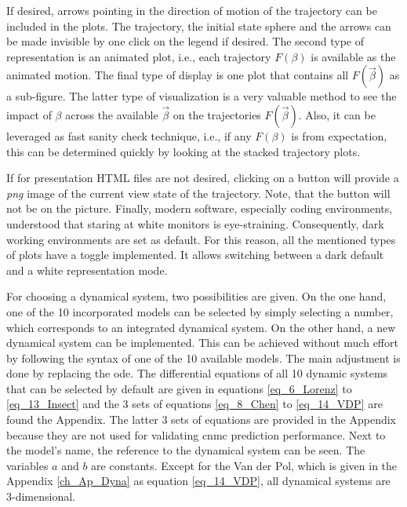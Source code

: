 If desired, arrows pointing in the direction of motion of the trajectory can be included in the plots.
The trajectory, the initial state sphere and the arrows can be made invisible by one click on the legend if desired. The second type of representation is an animated plot, i.e., each trajectory $ F(\beta)$ is available as the animated motion. The final type of display is one plot that contains all $F(\vec{\beta})$ as a sub-figure. 
The latter type of visualization is a very valuable method to see the impact of $\beta$ across the available $\vec{\beta }$ on the trajectories $ F(\vec{\beta})$.
Also, it can be leveraged as fast sanity check technique, i.e., if any $F(\beta )$ is from expectation, this can be determined quickly by looking at the stacked trajectory plots.
\newline

If for presentation HTML files are not desired, clicking on a button will provide a \emph{png} image of the current view state of the trajectory. Note, that the button will not be on the picture. 
Finally, modern software, especially coding environments, understood that staring at white monitors is eye-straining. Consequently, dark working environments are set as default. For this reason, all the mentioned types of plots have a toggle implemented. 
It allows switching between a dark default and a white representation mode.\newline  

For choosing a dynamical system, two possibilities are given. 
On the one hand, one of the 10 incorporated models can be selected by simply selecting a number, which corresponds to an integrated dynamical system. 
On the other hand, a new dynamical system can be implemented. 
This can be achieved without much effort by following the syntax of one of the 10 available models. The main adjustment is done by replacing the \gls{ode}. 
The differential equations of all 10 dynamic systems that can be selected by default are given in equations \eqref{eq_6_Lorenz} to \eqref{eq_13_Insect} and the 3 sets of equations  \eqref{eq_8_Chen} to \eqref{eq_14_VDP} are found the Appendix.
The latter 3  sets of equations are provided in the Appendix because they are not used for validating \gls{cnmc} prediction performance.
Next to the model's name, the reference to the dynamical system can be seen.
The variables $a$ and $b$ are constants. 
Except for the Van der Pol, which is given in the Appendix \ref{ch_Ap_Dyna} as equation \eqref{eq_14_VDP}, all dynamical systems are 3-dimensional.\newline

